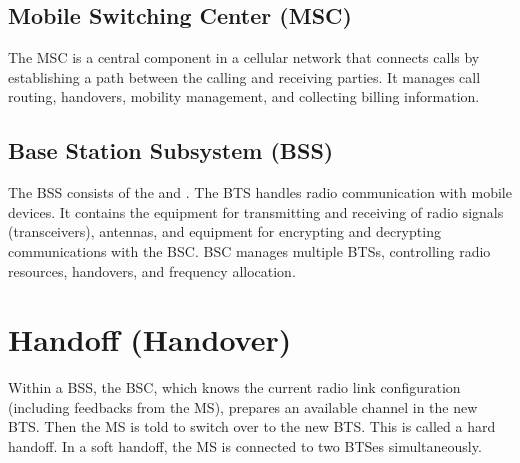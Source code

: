 \subsection{Mobile Switching Center (MSC)}
The MSC is a central component in a cellular network that connects calls by establishing a path between the calling and receiving parties. It manages call routing, handovers, mobility management, and collecting billing information.

\subsection{Base Station Subsystem (BSS)}
The BSS consists of the  and . The BTS handles radio communication with mobile devices. It contains the equipment for transmitting and receiving of radio signals (transceivers), antennas, and equipment for encrypting and decrypting communications with the BSC. BSC manages multiple BTSs, controlling radio resources, handovers, and frequency allocation.

\section{Handoff (Handover)}
Within a BSS, the BSC, which knows the current radio link configuration (including feedbacks from the MS), prepares an available channel in the new BTS. Then the MS is told to switch over to the new BTS. This is called a hard handoff. In a soft handoff, the MS is connected to two BTSes simultaneously.
